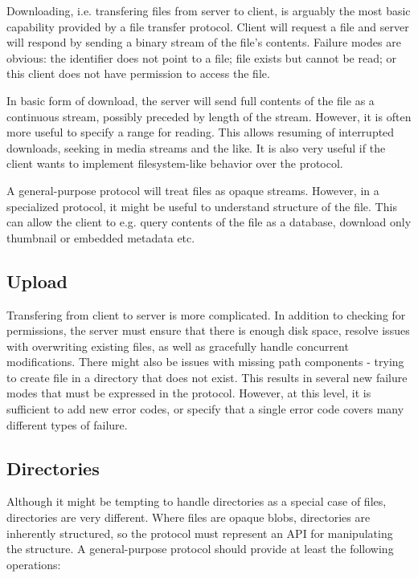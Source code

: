 Downloading, i.e. transfering files from server to client, is arguably the most basic capability provided by
a file transfer protocol. Client will request a file and server will respond by sending a binary stream of the
file's contents. Failure modes are obvious: the identifier does not point to a file; file exists but cannot be
read; or this client does not have permission to access the file.

In basic form of download, the server will send full contents of the file as a continuous stream, possibly
preceded by length of the stream. However, it is often more useful to specify a range for reading. This allows
resuming of interrupted downloads, seeking in media streams and the like. It is also very useful if the client
wants to implement filesystem-like behavior over the protocol.

A general-purpose protocol will treat files as opaque streams. However, in a specialized protocol, it might be
useful to understand structure of the file. This can allow the client to e.g. query contents of the file as
a database, download only thumbnail or embedded metadata etc.

\subsection{Upload}

Transfering from client to server is more complicated. In addition to checking for permissions, the server
must ensure that there is enough disk space, resolve issues with overwriting existing files, as well as
gracefully handle concurrent modifications. There might also be issues with missing path components - trying
to create file in a directory that does not exist. This results in several new failure modes that must be
expressed in the protocol. However, at this level, it is sufficient to add new error codes, or specify that
a single error code covers many different types of failure.

\subsection{Directories}

Although it might be tempting to handle directories as a special case of files, directories are very
different. Where files are opaque blobs, directories are inherently structured, so the protocol must represent
an API for manipulating the structure. A general-purpose protocol should provide at least the following
operations:

